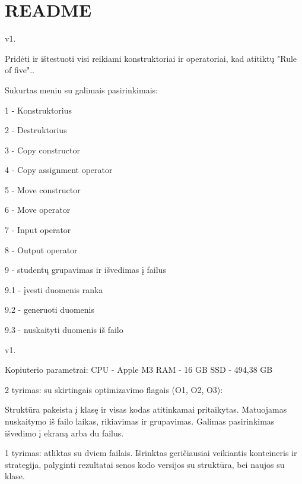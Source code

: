 \chapter{README}
\hypertarget{md__r_e_a_d_m_e}{}\label{md__r_e_a_d_m_e}
v1.

Pridėti ir ištestuoti visi reikiami konstruktoriai ir operatoriai, kad atitiktų "{}\+Rule of five"{}..

Sukurtas meniu su galimais pasirinkimais\+:

1 -\/ Konstruktorius 

2 -\/ Destruktorius 

3 -\/ Copy constructor 

4 -\/ Copy assignment operator 

5 -\/ Move constructor 

6 -\/ Move operator 

7 -\/ Input operator 

8 -\/ Output operator 

9 -\/ studentų grupavimas ir išvedimas į failus \begin{DoxyVerb}9.1 - įvesti duomenis ranka

9.2 - generuoti duomenis

9.3 - nuskaityti duomenis iš failo
\end{DoxyVerb}




v1.

Kopiuterio parametrai\+: CPU -\/ Apple M3 RAM -\/ 16 GB SSD -\/ 494,38 GB

2 tyrimas\+: su skirtingais optimizavimo flag\textquotesingle{}ais (O1, O2, O3)\+:





Struktūra pakeista į klasę ir visas kodas atitinkamai pritaikytas. Matuojamas nuskaitymo iš failo laikas, rikiavimas ir grupavimas. Galimas pasirinkimas išvedimo į ekraną arba du failus.

1 tyrimas\+: atliktas su dviem failais. Išrinktas geričiausiai veikiantis konteineris ir strategija, palyginti rezultatai senos kodo versijos su struktūra, bei naujos su klase.

 
